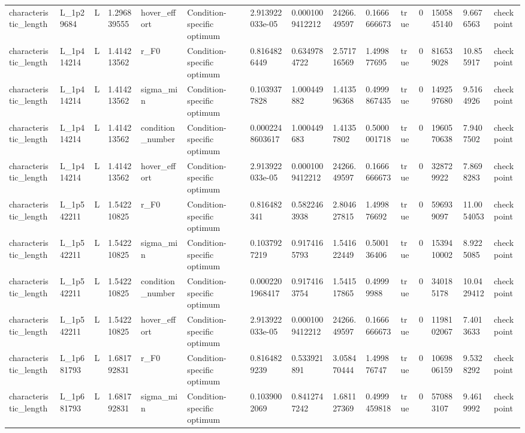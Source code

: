 \begin{tabular}{@{}lllllllllllllll@{}}
characteristic\_length & L\_1p29684 & L & 1.296839555 & hover\_effort & Condition-specific optimum & 2.913922033e-05 & 0.0001009412212 & 24266.49597 & 0.1666666673 & true & 0 & 1505845140 & 9.6676563 & checkpoint \\
characteristic\_length & L\_1p414214 & L & 1.414213562 & r\_F0 & Condition-specific optimum & 0.8164826449 & 0.6349784722 & 2.571716569 & 1.499877695 & true & 0 & 816539028 & 10.855917 & checkpoint \\
characteristic\_length & L\_1p414214 & L & 1.414213562 & sigma\_min & Condition-specific optimum & 0.1039377828 & 1.000449882 & 1.413596368 & 0.4999867435 & true & 0 & 1492597680 & 9.5164926 & checkpoint \\
characteristic\_length & L\_1p414214 & L & 1.414213562 & condition\_number & Condition-specific optimum & 0.0002248603617 & 1.000449683 & 1.41357802 & 0.5000001718 & true & 0 & 1960570638 & 7.9407502 & checkpoint \\
characteristic\_length & L\_1p414214 & L & 1.414213562 & hover\_effort & Condition-specific optimum & 2.913922033e-05 & 0.0001009412212 & 24266.49597 & 0.1666666673 & true & 0 & 328729922 & 7.8698283 & checkpoint \\
characteristic\_length & L\_1p542211 & L & 1.542210825 & r\_F0 & Condition-specific optimum & 0.816482341 & 0.5822463938 & 2.804627815 & 1.499876692 & true & 0 & 596939097 & 11.0054053 & checkpoint \\
characteristic\_length & L\_1p542211 & L & 1.542210825 & sigma\_min & Condition-specific optimum & 0.1037927219 & 0.9174165793 & 1.541622449 & 0.500136406 & true & 0 & 1539410002 & 8.9225085 & checkpoint \\
characteristic\_length & L\_1p542211 & L & 1.542210825 & condition\_number & Condition-specific optimum & 0.0002201968417 & 0.9174163754 & 1.541517865 & 0.49999988 & true & 0 & 340185178 & 10.0429412 & checkpoint \\
characteristic\_length & L\_1p542211 & L & 1.542210825 & hover\_effort & Condition-specific optimum & 2.913922033e-05 & 0.0001009412212 & 24266.49597 & 0.1666666673 & true & 0 & 1198102067 & 7.4013633 & checkpoint \\
characteristic\_length & L\_1p681793 & L & 1.681792831 & r\_F0 & Condition-specific optimum & 0.8164829239 & 0.533921891 & 3.058470444 & 1.499876747 & true & 0 & 1069806159 & 9.5328292 & checkpoint \\
characteristic\_length & L\_1p681793 & L & 1.681792831 & sigma\_min & Condition-specific optimum & 0.1039002069 & 0.8412747242 & 1.681127369 & 0.4999459818 & true & 0 & 570883107 & 9.4619992 & checkpoint \\

\end{tabular}
